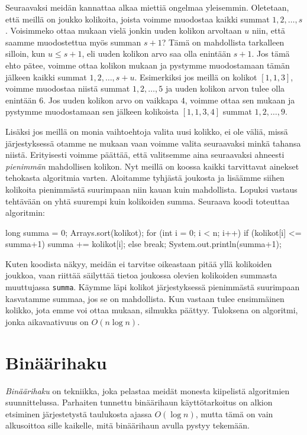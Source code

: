 Seuraavaksi meidän kannattaa alkaa miettiä ongelmaa yleisemmin.
Oletetaan, että meillä on joukko kolikoita,
joista voimme muodostaa kaikki summat $1,2,\dots,s$.
Voisimmeko ottaa mukaan vielä jonkin uuden kolikon arvoltaan $u$ niin,
että saamme muodostettua myös summan $s+1$?
Tämä on mahdollista tarkalleen silloin, kun $u \le s+1$,
eli uuden kolikon arvo saa olla enintään $s+1$.
Jos tämä ehto pätee, voimme ottaa kolikon mukaan ja
pystymme muodostamaan tämän jälkeen kaikki summat $1,2,\dots,s+u$.
Esimerkiksi jos meillä on kolikot $[1,1,3]$, voimme muodostaa
niistä summat $1,2,\dots,5$ ja uuden kolikon arvon tulee olla enintään $6$.
Jos uuden kolikon arvo on vaikkapa $4$, voimme ottaa sen mukaan ja
pystymme muodostamaan sen jälkeen kolikoista $[1,1,3,4]$ summat $1,2,\dots,9$.

Lisäksi jos meillä on monia vaihtoehtoja valita uusi kolikko,
ei ole väliä, missä järjestyksessä otamme ne mukaan vaan
voimme valita seuraavaksi minkä tahansa niistä.
Erityisesti voimme päättää, että valitsemme aina
seuraavaksi ahneesti \emph{pienimmän} mahdollisen kolikon.
Nyt meillä on koossa kaikki tarvittavat ainekset
tehokasta algoritmia varten.
Aloitamme tyhjästä joukosta ja lisäämme siihen kolikoita
pienimmästä suurimpaan niin kauan kuin mahdollista.
Lopuksi vastaus tehtävään on yhtä suurempi kuin kolikoiden
summa.
Seuraava koodi toteuttaa algoritmin:

\begin{code}
long summa = 0;
Arrays.sort(kolikot);
for (int i = 0; i < n; i++) {
    if (kolikot[i] <= summa+1) {
        summa += kolikot[i];
    } else {
        break;
    }
}
System.out.println(summa+1);
\end{code}

Kuten koodista näkyy, meidän ei tarvitse oikeastaan pitää yllä
kolikoiden joukkoa, vaan riittää säilyttää tietoa
joukossa olevien kolikoiden summasta muuttujassa \texttt{summa}.
Käymme läpi kolikot järjestyksessä pienimmästä suurimpaan
kasvatamme summaa, jos se on mahdollista.
Kun vastaan tulee ensimmäinen kolikko, jota emme voi ottaa mukaan,
silmukka päättyy.
Tuloksena on algoritmi, jonka aikavaativuus on $O(n \log n)$.

\section{Binäärihaku}

\emph{Binäärihaku} on tekniikka, joka pelastaa meidät monesta
kiipelistä algoritmien suunnittelussa.
Parhaiten tunnettu binäärihaun käyttötarkoitus on alkion
etsiminen järjestetystä taulukosta ajassa $O(\log n)$,
mutta tämä on vain alkusoittoa sille kaikelle,
mitä binäärihaun avulla pystyy tekemään.

